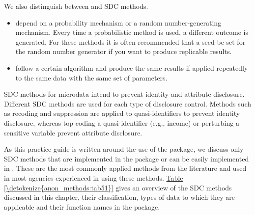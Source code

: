 \documentclass[letterpaper,10pt,english]{sphinxmanual}
\begin{document}
We also distinguish between  and  SDC
methods.
\begin{itemize}
\item {} 
 depend on a probability mechanism or a
random number-generating mechanism. Every time a probabilistic method
is used, a different outcome is generated. For these methods it is
often recommended that a seed be set for the random number generator
if you want to produce replicable results.

\item {} 
 follow a certain algorithm and produce the
same results if applied repeatedly to the same data with the same set
of parameters.

\end{itemize}

SDC methods for microdata intend to prevent identity and attribute
disclosure. Different SDC methods are used for each type of disclosure
control. Methods such as recoding and suppression are applied to
quasi-identifiers to prevent identity disclosure, whereas top coding a
quasi-identifier (e.g., income) or perturbing a sensitive variable
prevent attribute disclosure.

As this practice guide is written around the use of the 
package, we discuss only SDC methods that are implemented in the
 package or can be easily implemented in . These are the
most commonly applied methods from the literature and used in most
agencies experienced in using these methods. \hyperref[\detokenize{anon_methods:tab51}]{Table \ref{\detokenize{anon_methods:tab51}}} gives an overview
of the SDC methods discussed in this chapter, their classification,
types of data to which they are applicable and their function names in
the  package.
\end{document}
